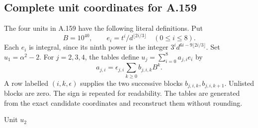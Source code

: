 \subsection*{Complete unit coordinates for A.159}
The four units in A.159 have the following literal definitions.  Put
\[B=10^{40},\qquad e_i=t^i/d^{\lfloor2i/3\rfloor}\quad(0\leq i\leq8).\]
Each $e_i$ is integral, since its ninth power is the integer
$3^i d^{6i-9\lfloor2i/3\rfloor}$.  Set $u_1=\alpha^2-2$.
For $j=2,3,4$, the tables define $u_j=\sum_{i=0}^8 a_{j,i}e_i$ by
\[a_{j,i}=\epsilon_{j,i}\sum_{k\geq0}b_{j,i,k}B^k.\]
A row labelled $(i,k,\epsilon)$ supplies the two successive blocks
$b_{j,i,k},b_{j,i,k+1}$.  Unlisted blocks are zero.
The sign is repeated for readability.  The tables are generated from the
exact candidate coordinates and reconstruct them without rounding.
\begingroup\setlength{\tabcolsep}{3pt}\fontsize{7.6}{9.2}\selectfont\ttfamily
\par\medskip\normalfont\normalsize Unit $u_2$\par\smallskip
\fontsize{7.6}{9.2}\selectfont\ttfamily
